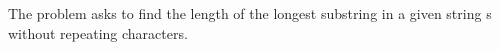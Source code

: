 \documentclass[preview]{standalone}
\begin{document}
The problem asks to find the length of the longest substring in a given string s without repeating characters.\\
\end{document}
